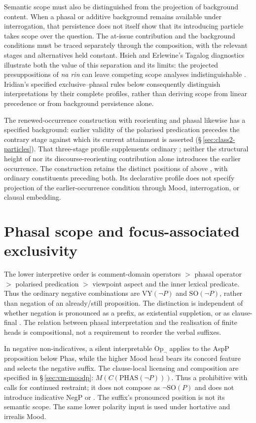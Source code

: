Semantic scope must also be distinguished from the projection of background
content. When a phasal or additive background remains available under
interrogation, that persistence does not itself show that its introducing
particle takes scope over the question. The at-issue contribution and the
background conditions must be traced separately through the composition,
with the relevant stages and alternatives held constant. Hsieh and Erlewine's
Tagalog diagnostics illustrate both the value of this separation and its
limits: the projected presuppositions of \textit{na rin} can leave competing
scope analyses indistinguishable \cite[appendix~A]{hsieherlewine2024}.
Iridian's specified exclusive--phasal rules below consequently distinguish
interpretations by their complete profiles, rather than deriving scope from
linear precedence or from background persistence alone.

The renewed-occurrence construction with reorienting  and
phasal  likewise has a specified background: earlier validity of
the polarised predication precedes the contrary stage against which its
current attainment is asserted (§\,\ref{sec:class2-particles}). That
three-stage profile supplements ordinary ; neither the structural
height of  nor its discourse-reorienting contribution alone
introduces the earlier occurrence. The construction retains the
distinct positions of  above , with ordinary constituents
preceding both. Its declarative profile does
not specify projection of the earlier-occurrence condition through Mood,
interrogation, or clausal embedding.


\section{Phasal scope and focus-associated exclusivity}
\label{sec:th-exclusive-phasal}

The lower interpretive order is comment-domain operators $>$ phasal operator
$>$ polarised predication $>$ viewpoint aspect and the inner lexical predicate. Thus the
ordinary negative combinations are $\mathrm{VY}(\neg P)$ and
$\mathrm{SO}(\neg P)$, rather than negation of an already/still proposition.
The distinction is independent of whether negation is pronounced as a prefix,
as existential suppletion, or as clause-final . The relation between
phasal interpretation and the realisation of finite heads is compositional,
not a requirement to reorder the verbal suffixes.

In negative non-indicatives, a silent interpretable $\mathrm{Op}_{\neg}$
applies to the AspP proposition below Phas, while the higher Mood head bears
its concord feature and selects the negative suffix. The clause-local
licensing and composition are specified in §\,\ref{sec:vm-moodp}:
$M(C(\mathrm{PHAS}(\neg P)))$. Thus a prohibitive with  calls for
continued restraint; it does not compose as $\neg\mathrm{SO}(P)$ and does
not introduce indicative NegP or . The suffix's pronounced position
is not its semantic scope. The same lower polarity input is used under
hortative and irrealis Mood.

